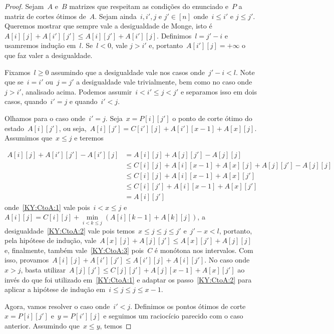 \begin{proof}
Sejam~$A$ e~$B$ matrizes que respeitam as condições do enunciado e~$P$ a matriz de cortes ótimos de~$A$. Sejam ainda~$i,i',j$ e $j' \in [n]$ onde~$i \leq i'$ e $j \leq j'$. Queremos mostrar que sempre vale a desigualdade de Monge, isto é~${A[i][j] + A[i'][j'] \leq A[i][j'] + A[i'][j]}$. Definimos~$l = j' - i$ e usamremos indução em~$l$. Se~${l < 0}$, vale ${j > i'}$ e, portanto~${A[i'][j] = +\infty}$ o que faz valer a desigualdade.

Fixamos~$l \geq 0$ assumindo que a desigualdade vale nos casos onde~${j' - i < l}$. Note que se~${i = i'}$ ou~${j = j'}$ a desigualdade vale trivialmente, bem como no caso onde~${j > i'}$, analisado acima. Podemos assumir~$i < i' \leq j < j'$ e separamos isso em dois casos, quando~$i' = j$ e quando~$i' < j$.

Olhamos para o caso onde~${i' = j}$. Seja~${x = P[i][j']}$ o ponto de corte ótimo do estado~$A[i][j']$, ou seja,~${A[i][j'] = C[i'][j] + A[i'][x-1] + A[x][j]}$. Assumimos que~${x \leq j}$ e teremos

\begin{align}
A[i][j] + A[i'][j'] - A[i'][j] &= A[i][j] + A[j][j'] - A[j][j] \nonumber \\
                               &\leq C[i][j] + A[i][x-1] + A[x][j] + A[j][j'] - A[j][j] \label{KY:CtoA:1} \\
                               &\leq C[i][j] + A[i][x-1] + A[x][j'] \label{KY:CtoA:2} \\
                               &\leq C[i][j'] + A[i][x-1] + A[x][j'] \label{KY:CtoA:3} \\
                               &= A[i][j']  \nonumber
\end{align}
onde~\eqref{KY:CtoA:1} vale pois~${i < x \leq j}$ e~${A[i][j] = C[i][j] + \min\limits_{i < k \leq j}(A[i][k-1] + A[k][j])}$, a desigualdade~\eqref{KY:CtoA:2} vale pois temos~${x \leq j \leq j \leq j'}$ e~$j' - x < l$, portanto, pela hipótese de indução, vale~${A[x][j] + A[j][j'] \leq A[x][j'] + A[j][j]}$ e, finalmente, também vale~\eqref{KY:CtoA:3} pois~$C$ é monótona nos intervalos. Com isso, provamos~${A[i][j] + A[i'][j'] \leq A[i'][j] + A[i][j']}$. No caso onde~${x > j}$, basta utilizar~${A[j][j'] \leq C[j][j'] + A[j][x-1] + A[x][j']}$ ao invés do que foi utilizado em~\eqref{KY:CtoA:1} e adaptar os passo~\eqref{KY:CtoA:2} para aplicar a hipótese de indução em~${i \leq j \leq j \leq x-1}$.

Agora, vamos resolver o caso onde~${i' < j}$. Definimos os pontos ótimos de corte~${x = P[i][j']}$ e~${y = P[i'][j]}$ e seguimos um raciocício parecido com o caso anterior. Assumindo que~${x \leq y}$, temos 


\end{proof}
